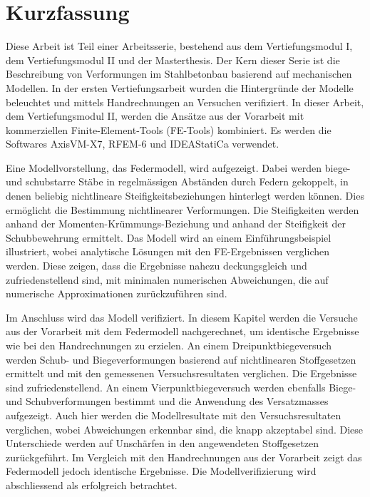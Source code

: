 \chapter*{Kurzfassung}

Diese Arbeit ist Teil einer Arbeitsserie, bestehend aus dem Vertiefungsmodul I, dem Vertiefungsmodul II und der Masterthesis. Der Kern dieser Serie ist die Beschreibung von Verformungen im Stahlbetonbau basierend auf mechanischen Modellen. In der ersten Vertiefungsarbeit wurden die Hintergründe der Modelle beleuchtet und mittels Handrechnungen an Versuchen verifiziert. In dieser Arbeit, dem Vertiefungsmodul II, werden die Ansätze aus der Vorarbeit mit kommerziellen Finite-Element-Tools (FE-Tools) kombiniert. Es werden die Softwares AxisVM-X7, RFEM-6 und IDEAStatiCa verwendet.

Eine Modellvorstellung, das Federmodell, wird aufgezeigt. Dabei werden biege- und schubstarre Stäbe in regelmässigen Abständen durch Federn gekoppelt, in denen beliebig nichtlineare Steifigkeitsbeziehungen hinterlegt werden können. Dies ermöglicht die Bestimmung nichtlinearer Verformungen. Die Steifigkeiten werden anhand der Momenten-Krümmungs-Beziehung und anhand der Steifigkeit der Schubbewehrung ermittelt. Das Modell wird an einem Einführungsbeispiel illustriert, wobei analytische Lösungen mit den FE-Ergebnissen verglichen werden. Diese zeigen, dass die Ergebnisse nahezu deckungsgleich und zufriedenstellend sind, mit minimalen numerischen Abweichungen, die auf numerische Approximationen zurückzuführen sind.

Im Anschluss wird das Modell verifiziert. In diesem Kapitel werden die Versuche aus der Vorarbeit mit dem Federmodell nachgerechnet, um identische Ergebnisse wie bei den Handrechnungen zu erzielen. An einem Dreipunktbiegeversuch werden Schub- und Biegeverformungen basierend auf nichtlinearen Stoffgesetzen ermittelt und mit den gemessenen Versuchsresultaten verglichen. Die Ergebnisse sind zufriedenstellend. An einem Vierpunktbiegeversuch werden ebenfalls Biege- und Schubverformungen bestimmt und die Anwendung des Versatzmasses aufgezeigt. Auch hier werden die Modellresultate mit den Versuchsresultaten verglichen, wobei Abweichungen erkennbar sind, die knapp akzeptabel sind. Diese Unterschiede werden auf Unschärfen in den angewendeten Stoffgesetzen zurückgeführt. Im Vergleich mit den Handrechnungen aus der Vorarbeit zeigt das Federmodell jedoch identische Ergebnisse. Die Modellverifizierung wird abschliessend als erfolgreich betrachtet.

